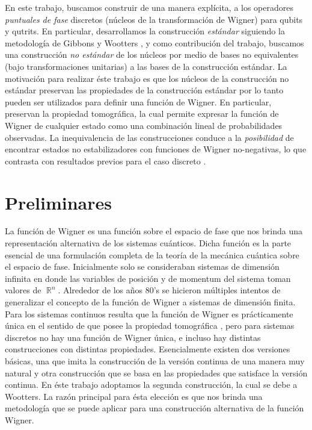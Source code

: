 \documentclass[a4paper,11pt]{report}
\DeclareMathOperator{\R}{\mathbb{R}}
\begin{document}
  En este trabajo, buscamos construir de una manera
  explícita, a los operadores \textit{puntuales de fase}
  discretos (núcleos de la transformación de Wigner) para
  qubits y qutrits. En particular, desarrollamos la
  construcción \textit{estándar} siguiendo la metodología de
  Gibbons y Wootters \cite{wootters1987}, y como
  contribución del trabajo, buscamos una construcción
  \textit{no estándar} de los núcleos por medio de bases no
  equivalentes (bajo transformaciones unitarias) a las bases
  de la construcción estándar. La motivación para realizar
  éste trabajo es que los núcleos de la construcción no
  estándar preservan las propiedades de la construcción
  estándar por lo tanto pueden ser utilizados para definir
  una función de Wigner. En particular, preservan la
  propiedad tomográfica, la cual permite expresar la función
  de Wigner de cualquier estado como una combinación lineal
  de probabilidades observadas. La inequivalencia de las
  construcciones conduce a la \textit{posibilidad} de
  encontrar estados no estabilizadores con funciones de
  Wigner no-negativas, lo que contrasta con resultados
  previos para el caso discreto \cite{gross2006, galvao2005,
  cormick2006a}.

  \chapter{Preliminares}

  La función de Wigner es una función sobre el espacio de
  fase que nos brinda una representación alternativa de los
  sistemas cuánticos. Dicha función es la parte esencial de
  una formulación completa de la teoría de la mecánica
  cuántica sobre el espacio de fase. Inicialmente solo se
  consideraban sistemas de dimensión infinita en donde las
  variables de posición y de momentum del sistema toman
  valores de $\R^{n}$. Alrededor de los años 80's se hicieron
  múltiples intentos de generalizar el concepto de la
  función de Wigner a sistemas de dimensión finita. Para los
  sistemas continuos resulta que la función de Wigner es
  prácticamente única en el sentido de que posee la
  propiedad tomográfica \cite{ellinas2008}, pero para
  sistemas discretos no hay una función de Wigner única, e
  incluso hay distintas construcciones con distintas
  propiedades.  Esencialmente existen dos versiones básicas,
  una que imita la construcción de la versión continua de
  una manera muy natural y otra construcción que se basa en
  las propiedades que satisface la versión continua. En éste
  trabajo adoptamos la segunda construcción, la cual se debe
  a Wootters. La razón principal para ésta elección es que
  nos brinda una metodología que se puede aplicar para una
  construcción alternativa de la función Wigner.
\end{document}
